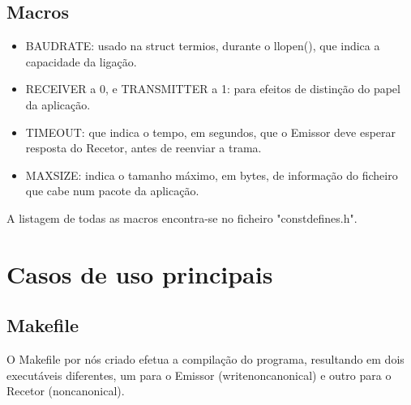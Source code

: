 \documentclass[article, a4paper, 11pt, oneside]{memoir}
\begin{document}
\section{Macros}
\begin{itemize}
	\item BAUDRATE: usado na struct termios, durante o llopen(), que indica a capacidade da ligação.
	\item RECEIVER a 0, e TRANSMITTER a 1: para efeitos de distinção do papel da aplicação.
	\item TIMEOUT: que indica o tempo, em segundos, que o Emissor deve esperar resposta do Recetor, antes de reenviar a trama.
	\item MAX\textunderscore SIZE: indica o tamanho máximo, em bytes, de informação do ficheiro que cabe num pacote da aplicação.
\end{itemize}

A listagem de todas as macros encontra-se no ficheiro "const\textunderscore defines.h".

\chapter[Casos de uso principais][Casos de uso principais]{Casos de uso principais} \label{\thechapter}

\section{Makefile}
O Makefile por nós criado efetua a compilação do programa, resultando em dois executáveis diferentes, um para o Emissor (writenoncanonical) 
e outro para o Recetor (noncanonical).
\end{document}
